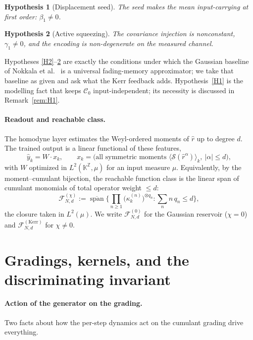 \documentclass[11pt]{article}
\newtheorem{hypothesis}{Hypothesis}
\theoremstyle{remark}
\newcommand{\rhat}{\hat{r}}
\newcommand{\Fclass}[2]{\mathcal{F}^{(#1)}_{#2}}
\newcommand{\Kerr}{\mathrm{Kerr}}
\newcommand{\Cz}{\mathcal{C}_0}
\begin{document}
\begin{hypothesis}[Displacement seed]\label{H3}
The seed makes the mean input-carrying at first order: $\beta_1\neq0$.
\end{hypothesis}

\begin{hypothesis}[Active squeezing]\label{H4}
The covariance injection is nonconstant, $\gamma_1\neq0$, and the encoding is
non-degenerate on the measured channel.
\end{hypothesis}

Hypotheses \ref{H2}--\ref{H4} are exactly the conditions under which the Gaussian
baseline of Nokkala et al.~\cite{nokkala2021} is a universal fading-memory
approximator; we take that baseline as given and ask what the Kerr feedback adds.
Hypothesis~\ref{H1} is the modelling fact that keeps $\Cz$ input-independent; its
necessity is discussed in Remark~\ref{rem:H1}.

\paragraph{Readout and reachable class.}
The homodyne layer estimates the Weyl-ordered moments of $\rhat$ up to degree $d$.
The trained output is a linear functional of these features,
\begin{equation}
\hat y_k = W\cdot x_k,\qquad
x_k = \big(\text{all symmetric moments }\langle \mathcal{S}(\rhat^\alpha)\rangle_k,\ |\alpha|\le d\big),
\label{eq:readout}
\end{equation}
with $W$ optimized in $L^2(\mathbb{K}^{\mathbb{Z}},\mu)$ for an input measure
$\mu$. Equivalently, by the moment--cumulant bijection, the reachable function
class is the linear span of cumulant monomials of total operator weight $\le d$:
\begin{equation}
\Fclass{\chi}{N,d} := \overline{\operatorname{span}}
\Big\{\textstyle\prod_{n\ge1}\big(\kappa^{(n)}_k\big)^{\otimes q_n}:
\textstyle\sum_n n\,q_n\le d\Big\},
\label{eq:Fclass}
\end{equation}
the closure taken in $L^2(\mu)$. We write $\Fclass{0}{N,d}$ for the Gaussian
reservoir ($\chi=0$) and $\Fclass{\Kerr}{N,d}$ for $\chi\neq0$.

\section{Gradings, kernels, and the discriminating invariant}
\label{sec:gradings}

\paragraph{Action of the generator on the grading.}
Two facts about how the per-step dynamics act on the cumulant grading drive
everything.
\end{document}

